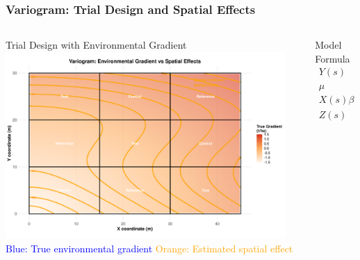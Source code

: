 \documentclass[aspectratio=43]{beamer}
\begin{document}
\begin{frame}
    \frametitle{Variogram: Trial Design and Spatial Effects}
    \begin{columns}[T]
        \begin{column}{0.55\textwidth}
            \begin{block}{Trial Design with Environmental Gradient}
                \centering
                \includegraphics[width=0.95\textwidth]{Imgs/variogram_trial_design_spatial.png}
                \vspace{0.5em}
                \scriptsize
                \textcolor{blue}{Blue: True environmental gradient}
                \textcolor{orange}{Orange: Estimated spatial effect}
            \end{block}
        \end{column}
        \begin{column}{0.45\textwidth}
            \begin{block}{Model Formula}
                \vspace{0.5em}
                \begin{align*}
                    Y(s) &= \mu + X(s)\beta + Z(s) \\
                    \mu &: \text{Overall mean} \\
                    X(s)\beta &: \text{Treatment effect} \\
                    Z(s) &: \text{Spatial effect (covariance)}
                \end{align*}
            \end{block}
        \end{column}
    \end{columns}
\end{frame}
\end{document}
